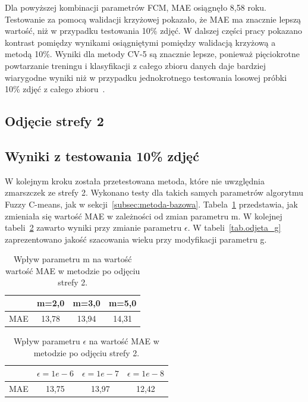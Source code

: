 \documentclass[a4paper,twoside,12pt]{book}
\begin{document}
    Dla powyższej kombinacji parametrów FCM, MAE osiągnęło 8,58 roku.
    Testowanie za pomocą walidacji krzyżowej pokazało, że MAE ma znacznie lepszą wartość, niż w przypadku testowania
    10\% zdjęć. W dalszej części pracy pokazano kontrast pomiędzy wynikami osiągniętymi pomiędzy walidacją krzyżową a
    metodą 10\%. Wyniki dla metody CV-5 są znacznie lepsze, ponieważ pięciokrotne powtarzanie treningu i klasyfikacji
    z całego zbioru danych daje bardziej wiarygodne wyniki niż w przypadku jednokrotnego testowania losowej
    próbki 10\% zdjęć z całego zbioru~\cite{dataMiningAlgorithms}.

    \subsection{Odjęcie strefy 2}\label{subsec:odjęcie-strefy-2}
    \subsection*{Wyniki z testowania 10\% zdjęć}
    W kolejnym kroku została przetestowana metoda, które nie uwzględnia zmarszczek ze strefy 2.
    Wykonano testy dla takich samych parametrów algorytmu Fuzzy C-means, jak w sekcji~\ref{subsec:metoda-bazowa}.
    Tabela~\ref{tab.odjeta_m} przedstawia, jak zmieniała się wartość MAE w zależności od zmian parametru m.
    W kolejnej tabeli~\ref{tab.odjeta_e} zawarto wyniki przy
    zmianie parametru $\epsilon$.
    W tabeli~\ref{tab.odjeta_g} zaprezentowano
    jakość szacowania
    wieku przy modyfikacji parametru g.
    \begin{table}[]
        \centering
        \caption{Wpływ parametru m na wartość wartość MAE w metodzie po odjęciu strefy 2.}
        \begin{tabular}{|c|c|c|c|}
            \hline
            & m=2,0 & m=3,0 & m=5,0 \\ \hline
            MAE & 13,78 & 13,94 & 14,31 \\ \hline
        \end{tabular}
        \label{tab.odjeta_m}
    \end{table}
    \begin{table}[]
        \centering
        \caption{Wpływ parametru $\epsilon$ na wartość MAE w metodzie po odjęciu strefy 2.}
        \begin{tabular}{|c|c|c|c|}
            \hline
            & $\epsilon=1e-6$ & $\epsilon=1e-7$ & $\epsilon=1e-8$ \\ \hline
            MAE & 13,75 & 13,97 & 12,42 \\ \hline
        \end{tabular}
        \label{tab.odjeta_e}
    \end{table}
\end{document}
